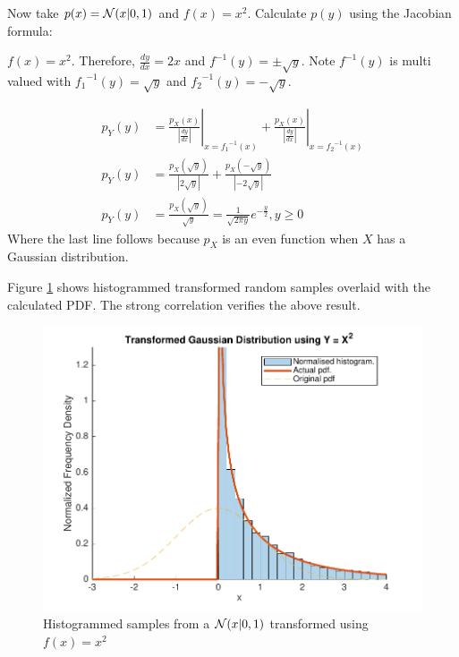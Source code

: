 \documentclass[12pt]{article}
\begin{document}
\begin{enumerate}
Now take $p(x)={\cal N}(x|0,1)$ and $f(x)=x^2$. Calculate $p(y)$ using the Jacobian formula:

$f(x) = x^2$. Therefore, $\frac{dy}{dx} = 2x$  and $f^{-1}(y) = \pm \sqrt{y}$. Note $f^{-1}(y)$ is multi valued with ${f_1}^{-1}(y) = \sqrt{y}$ and ${f_2}^{-1}(y) = -\sqrt{y}$.

\begin{align*}
p_Y(y)  &= \left. \frac {p_X(x)} {\left| \frac {dy} {dx} \right|} \right|_{x = {f_1} ^ {-1} (x)}
+ \left. \frac {p_X (x)} {\left| \frac {dy} {dx} \right|} \right|_{x = {f_2} ^ {-1} (x)}
\\ p_Y(y) & = \frac {p_X ( \sqrt y )} {\left| 2 \sqrt y \right|} + \frac {p_X (- \sqrt y)} {\left| - 2 \sqrt y \right|}
\\ p_Y(y) & = \frac {p_X (\sqrt y)} {\sqrt y} = \frac 1 {\sqrt{2 \pi y}} e ^ { - \frac {y} {2}}, y \ge 0
\end{align*}
Where the last line follows because $p_X$ is an even function when $X$ has a Gaussian distribution.


Figure \ref{fig:gaussian-quadractic-transform} shows histogrammed transformed random samples overlaid with the calculated PDF. The strong correlation verifies the above result.


\begin{figure}[H]
\includegraphics[width=\textwidth]{figures/gaussian-quadratic-transform.pdf}
  \caption{Histogrammed samples from a ${\cal N}(x|0,1)$ transformed using $f(x) = x^2$ }
  \label{fig:gaussian-quadractic-transform}
\end{figure}



\end{enumerate}
\end{document}
